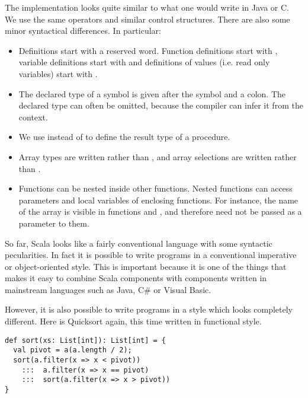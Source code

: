 The implementation looks quite similar to what one would write in Java
or C.  We use the same operators and similar control structures.
There are also some minor syntactical differences. In particular:
\begin{itemize}
\item
Definitions start with a reserved word. Function definitions start
with , variable definitions start with  and
definitions of values (i.e. read only variables) start with .
\item
The declared type of a symbol is given after the symbol and a colon.
The declared type can often be omitted, because the compiler can infer
it from the context.
\item
We use  instead of  to define the result type of
a procedure.
\item
Array types are written  rather than , 
and array selections are written  rather than .
\item
Functions can be nested inside other functions. Nested functions can
access parameters and local variables of enclosing functions. For
instance, the name of the array  is visible in functions
 and , and therefore need not be passed as a
parameter to them.
\end{itemize}
So far, Scala looks like a fairly conventional language with some
syntactic pecularities. In fact it is possible to write programs in a
conventional imperative or object-oriented style. This is important
because it is one of the things that makes it easy to combine Scala
components with components written in mainstream languages such as
Java, C\# or Visual Basic.

However, it is also possible to write programs in a style which looks
completely different. Here is Quicksort again, this time written in
functional style.

\begin{lstlisting}
def sort(xs: List[int]): List[int] = {
  val pivot = a(a.length / 2);
  sort(a.filter(x => x < pivot))
    :::  a.filter(x => x == pivot)
    :::  sort(a.filter(x => x > pivot))
}
\end{lstlisting}

